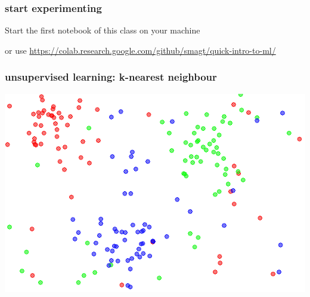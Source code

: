 \documentclass[USenglish,pdftex,compress,10pt,svgnamesi]{beamer}%
\begin{document}
%
%
%
%
%
%
%
%
%
%



%
%
%


\begin{frame}
\frametitle{start experimenting}

Start the first notebook of this class on your machine

or use 
\url{https://colab.research.google.com/github/smagt/quick-intro-to-ml/}

\end{frame}


\begin{frame}
\frametitle{unsupervised learning: k-nearest neighbour}

 \includegraphics[width=\textwidth]{knn}

\end{frame}
\end{document}

